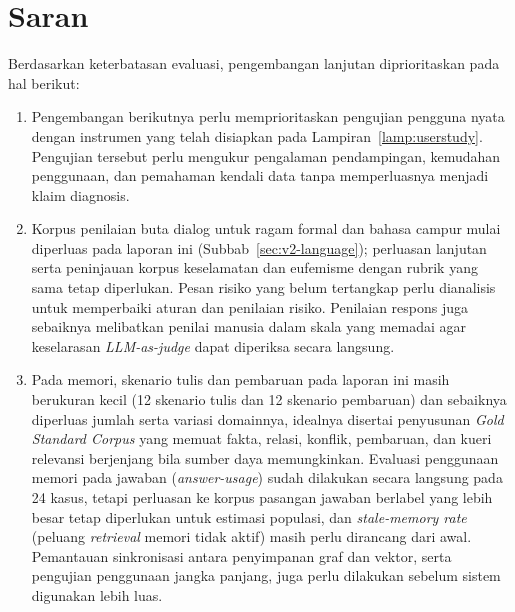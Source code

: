 \section{Saran}
\label{sec:saran}


Berdasarkan keterbatasan evaluasi, pengembangan lanjutan diprioritaskan pada hal berikut:
\begin{enumerate}[label=\arabic*.,leftmargin=*,itemsep=4pt]
\item Pengembangan berikutnya perlu memprioritaskan pengujian pengguna nyata dengan instrumen yang telah disiapkan pada Lampiran~\ref{lamp:userstudy}. Pengujian tersebut perlu mengukur pengalaman pendampingan, kemudahan penggunaan, dan pemahaman kendali data tanpa memperluasnya menjadi klaim diagnosis.

\item Korpus penilaian buta dialog untuk ragam formal dan bahasa campur mulai diperluas pada laporan ini (Subbab~\ref{sec:v2-language}); perluasan lanjutan serta peninjauan korpus keselamatan dan eufemisme dengan rubrik yang sama tetap diperlukan. Pesan risiko yang belum tertangkap perlu dianalisis untuk memperbaiki aturan dan penilaian risiko. Penilaian respons juga sebaiknya melibatkan penilai manusia dalam skala yang memadai agar keselarasan \textit{LLM-as-judge} dapat diperiksa secara langsung.

\item Pada memori, skenario tulis dan pembaruan pada laporan ini masih berukuran kecil (12 skenario tulis dan 12 skenario pembaruan) dan sebaiknya diperluas jumlah serta variasi domainnya, idealnya disertai penyusunan \textit{Gold Standard Corpus} yang memuat fakta, relasi, konflik, pembaruan, dan kueri relevansi berjenjang bila sumber daya memungkinkan. Evaluasi penggunaan memori pada jawaban (\textit{answer-usage}) sudah dilakukan secara langsung pada 24 kasus, tetapi perluasan ke korpus pasangan jawaban berlabel yang lebih besar tetap diperlukan untuk estimasi populasi, dan \textit{stale-memory rate} (peluang \textit{retrieval} memori tidak aktif) masih perlu dirancang dari awal. Pemantauan sinkronisasi antara penyimpanan graf dan vektor, serta pengujian penggunaan jangka panjang, juga perlu dilakukan sebelum sistem digunakan lebih luas.
\end{enumerate}